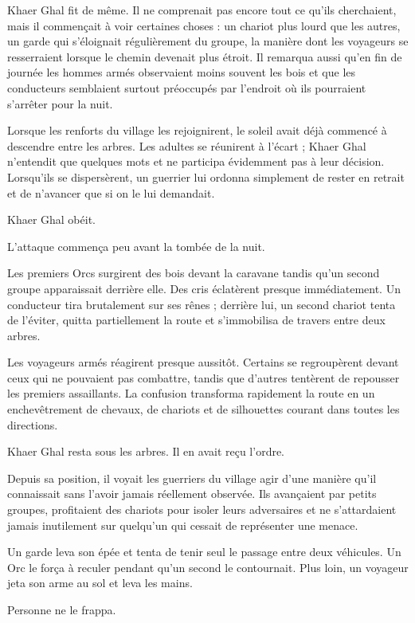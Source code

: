 Khaer Ghal fit de même. Il ne comprenait pas encore tout ce qu'ils cherchaient,
mais il commençait à voir certaines choses : un chariot plus lourd que les
autres, un garde qui s'éloignait régulièrement du groupe, la manière dont les
voyageurs se resserraient lorsque le chemin devenait plus étroit. Il remarqua
aussi qu'en fin de journée les hommes armés observaient moins souvent les bois
et que les conducteurs semblaient surtout préoccupés par l'endroit où ils
pourraient s'arrêter pour la nuit.

Lorsque les renforts du village les rejoignirent, le soleil avait déjà commencé
à descendre entre les arbres. Les adultes se réunirent à l'écart ; Khaer Ghal
n'entendit que quelques mots et ne participa évidemment pas à leur décision.
Lorsqu'ils se dispersèrent, un guerrier lui ordonna simplement de rester en
retrait et de n'avancer que si on le lui demandait.

Khaer Ghal obéit.

\scenebreak

L'attaque commença peu avant la tombée de la nuit.

Les premiers Orcs surgirent des bois devant la caravane tandis qu'un second
groupe apparaissait derrière elle. Des cris éclatèrent presque immédiatement.
Un conducteur tira brutalement sur ses rênes ; derrière lui, un second chariot
tenta de l'éviter, quitta partiellement la route et s'immobilisa de travers
entre deux arbres.

Les voyageurs armés réagirent presque aussitôt. Certains se regroupèrent devant
ceux qui ne pouvaient pas combattre, tandis que d'autres tentèrent de repousser
les premiers assaillants. La confusion transforma rapidement la route en un
enchevêtrement de chevaux, de chariots et de silhouettes courant dans toutes
les directions.

Khaer Ghal resta sous les arbres. Il en avait reçu l'ordre.

Depuis sa position, il voyait les guerriers du village agir d'une manière qu'il
connaissait sans l'avoir jamais réellement observée. Ils avançaient par petits
groupes, profitaient des chariots pour isoler leurs adversaires et ne
s'attardaient jamais inutilement sur quelqu'un qui cessait de représenter une
menace.

Un garde leva son épée et tenta de tenir seul le passage entre deux véhicules.
Un Orc le força à reculer pendant qu'un second le contournait. Plus loin, un
voyageur jeta son arme au sol et leva les mains.

Personne ne le frappa.

